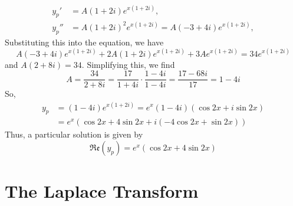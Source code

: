 \documentclass[a4paper]{article}
\begin{document}
\begin{enumerate}
\begin{align*}
        y_p'&=A(1+2i)e^{x(1+2i)}, \\
        y_p''&=A(1+2i)^2e^{x(1+2i)}=A(-3+4i)e^{x(1+2i)},
    \end{align*}
    Substituting this into the equation, we have
    \begin{equation*}
        A(-3+4i)e^{x(1+2i)}+2A(1+2i)e^{x(1+2i)}+3Ae^{x(1+2i)}=34e^{x(1+2i)}
    \end{equation*}
    and $A(2+8i)=34$. Simplifying this, we find
    \begin{equation}
        A=\frac{34}{2+8i}=\frac{17}{1+4i}\cdot\frac{1-4i}{1-4i}=\frac{17-68i}{17}=1-4i
    \end{equation}
    So,
    \begin{align*}
        y_p&=(1-4i)e^{x(1+2i)}=e^x(1-4i)(\cos 2x+i\sin 2x) \\
        &=e^x(\cos 2x+4\sin 2x+i(-4\cos 2x+\sin 2x))
    \end{align*}
    Thus, a particular solution is given by
    \begin{equation*}
        \mathfrak{Re}(y_p)=e^x(\cos 2x+4\sin 2x)
    \end{equation*}
\end{enumerate}
\newpage
\section{The Laplace Transform}
\end{document}
